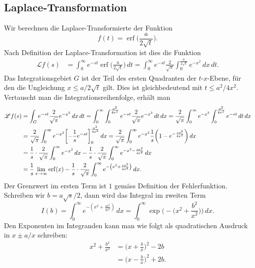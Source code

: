 %
%
\subsection{Laplace-Transformation}
Wir berechnen die Laplace-Transformierte der Funktion
\[
f(t) = \operatorname{erf}\biggl(\frac{a}{2\sqrt{t}}\biggr).
\]
Nach Definition der Laplace-Transformation ist dies die Funktion
\begin{align*}
\mathscr{L}f(s)
&=
\int_0^\infty
e^{-st} \operatorname{erf}\biggl(\frac{a}{2\sqrt{t}}\biggr)
\,dt
=
\int_0^\infty
e^{-st}
\frac{2}{\sqrt{\pi}}
\int_0^{\frac{a}{2\sqrt{t}}}
e^{-x^2}
\,dx
\,dt.
\end{align*}
Das Integrationsgebiet $G$ ist der Teil des ersten Quadranten der
$t$-$x$-Ebene, für den die Ungleichung $x \le a/2\sqrt{t}$ gilt.
Dies ist gleichbedeutend mit $t \le a^2/4x^2$.
Vertauscht man die Integrationsreihenfolge, erhält man
\begin{align}
\mathscr{L}f(s)
&=
\int_G
e^{-st}
\frac{2}{\sqrt{\pi}}
e^{-x^2}
\,dx \,dt
=
\int_0^\infty
\int_0^{\frac{a^2}{4x^2}}
e^{-st}
\frac{2}{\sqrt{\pi}}
e^{-x^2}
\,dt
\,dx
=
\frac{2}{\sqrt{\pi}}
\int_0^\infty
e^{-x^2}
\int_0^{\frac{a^2}{4x^2}}
e^{-st}
\,dt
\,dx
\notag
\\
&=
\frac{2}{\sqrt{\pi}}
\int_0^\infty
e^{-x^2}
\biggl[
-\frac1{s}e^{-st}
\biggr]_0^{\frac{a^2}{4x^2}}
\,dx
=
\frac{2}{\sqrt{\pi}}
\int_0^\infty
e^{-x^2}
\frac1{s}
\biggl(
1-e^{-\frac{sa^2}{4x^2}}
\biggr)
\,dx
\notag
\\
&=
\frac{1}{s}
\cdot
\frac{2}{\sqrt{\pi}}\int_0^\infty e^{-x^2}\,dx
-
\frac1{s}
\cdot
\frac{2}{\sqrt{\pi}}
\int_0^\infty
e^{-x^2-\frac{sa^2}{4x^2}}
\,dx
\notag
\\
&=
\frac1s\lim_{x\to\infty} \operatorname{erf}(x)
-
\frac1s
\cdot
\frac{2}{\sqrt{\pi}}
\int_0^\infty e^{-\left(x^2+\frac{sa^2}{4x^2}\right)}\,dx.
\label{buch:integrale:eqn:laplaceerf}
\end{align}
Der Grenzwert im ersten Term ist $1$ gemäss Definition der Fehlerfunktion. 
Schreiben wir $b=a\sqrt{s}/2$, dann wird das Integral im zweiten Term
\begin{equation}
I(b)
=
\int_0^\infty e^{-\left(x^2+\frac{sa^2}{4x^2}\right)}\,dx
=
\int_0^\infty \exp\biggl(-\biggl(x^2+\frac{b^2}{x^2}\biggr)\biggr)\,dx.
\label{buch:integrale:eqn:Ibsumme}
\end{equation}
Den Exponenten im Integranden kann man wie folgt als quadratischen
Ausdruck in $x\pm a/x$ schreiben:
\begin{equation*}
\begin{aligned}
x^2 + \frac{b^2}{x^2}
&=
\biggl(x+\frac{b}{x}\biggr)^2 - 2b
\\
&=
\biggl(x-\frac{b}{x}\biggr)^2 + 2b.
\end{aligned}
\end{equation*}

